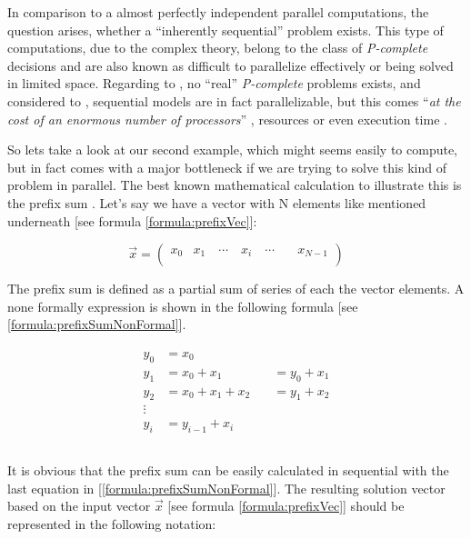\noindent In comparison to a almost perfectly independent parallel computations, the question arises, whether a ``inherently sequential'' problem exists. This type of computations, due to the complex theory, belong to the class of \textit{P-complete} \parencite{inbook1} decisions and are also known as difficult to parallelize effectively or being solved in limited space. Regarding to \parencite{inbook1}, no ``real'' \textit{P-complete} problems exists, and considered to \parencite{book8}, sequential models are in fact parallelizable, but this comes ``\textit{at the cost of an enormous number of processors}'' \parencite[see][Chapter 5.5, p69]{book8}, resources or even execution time \parencite[see][p61]{book8}.

So lets take a look at our second example, which might seems easily to compute, but in fact comes with a major bottleneck if we are trying to solve this kind of problem in parallel. The best known mathematical calculation to illustrate this is the prefix sum \parencite{article7}. Let's say we have a vector with N elements like mentioned underneath [see formula \ref{formula:prefixVec}]:

\begin{equation} \label{formula:prefixVec}
\vec{x} = \begin{pmatrix}
	x_{0} & x_{1} \quad \cdots \quad x_{i} \quad \cdots \quad & x_{N - 1} \\
\end{pmatrix}
\end{equation}

\newpage

The prefix sum is defined as a partial sum of series of each the vector elements. A none formally expression is shown in the following formula [see \ref{formula:prefixSumNonFormal}].

\begin{align} \label{formula:prefixSumNonFormal}
	\begin{aligned}
	y_0 &= x_0 \\
	y_1 &= x_0 + x_1 \quad &= y_0 + x_1 \\
	y_2 &= x_0 + x_1 + x_2 \quad &= y_1 + x_2 \\
	\vdots \\
	y_i &= y_{i - 1} + x_i \\
	\end{aligned}
\end{align}
\\[2pt]
\noindent It is obvious that the prefix sum can be easily calculated in sequential with the last equation in [\ref{formula:prefixSumNonFormal}]. The resulting solution vector based on the input vector $\vec{x}$ [see formula \ref{formula:prefixVec}] should be represented in the following notation:\\

